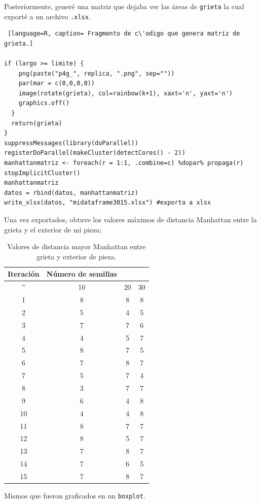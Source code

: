 \documentclass{article}
\begin{document}
Posteriormente, gener\'e una matriz que dejaba ver las \'areas de \texttt{grieta} la cual export\'e a un archivo \texttt{.xlsx}.
\newpage

\begin{lstlisting} [language=R, caption= Fragmento de c\'odigo que genera matriz de grieta.]

if (largo >= limite) {
    png(paste("p4g_", replica, ".png", sep=""))
    par(mar = c(0,0,0,0))
    image(rotate(grieta), col=rainbow(k+1), xaxt='n', yaxt='n')
    graphics.off()
  }
  return(grieta)
}
suppressMessages(library(doParallel))
registerDoParallel(makeCluster(detectCores() - 2))
manhattanmatriz <- foreach(r = 1:1, .combine=c) %dopar% propaga(r)
stopImplicitCluster()
manhattanmatriz
datos = rbind(datos, manhattanmatriz)
write_xlsx(datos, "midataframe3015.xlsx") #exporta a xlsx

\end{lstlisting}

Una vez exportados, obtuve los valores m\'aximos de distancia Manhattan entre la grieta y el exterior de mi pieza;
\begin{table}[ht]
    \centering
    \caption{Valores de distancia mayor Manhattan entre grieta y exterior de pieza.}
    \begin{tabular}{|c|c|c|c|}
    \hline
    Iteraci\'on & N\'umero de semillas & & \\
    \hline
   '' & 10 & 20 & 30 \\
    \hline
    1 & 8 & 8 & 8 \\
    \hline
    2 & 5 & 4 & 5 \\
    \hline
    3 & 7 & 7 & 6 \\
    \hline
    4 & 4 & 5 & 7 \\
    \hline
    5 & 8 & 7 & 5 \\
    \hline
    6 & 7 & 8 & 7 \\
    \hline
    7 & 5 & 7 & 4 \\
    \hline
    8 & 3 & 7 & 7 \\
    \hline
    9 & 6 & 4 & 8 \\
    \hline
    10 & 4 & 4 & 8 \\
    \hline
    11 & 8 & 7 & 7 \\
    \hline
    12 & 8 & 5 & 7 \\
    \hline
    13 & 7 & 8 & 7 \\
    \hline
    14 & 7 & 6 & 5 \\
    \hline
    15 & 7 & 8 & 7 \\
    \hline
    \end{tabular}
    \label{cuadro 1}
\end{table}
Mismos que fueron graficados en un \texttt{boxplot}.
\end{document}
